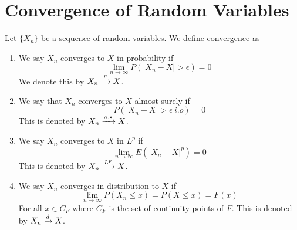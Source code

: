 \documentclass[openany]{report}
\begin{document}
    \chapter{Convergence of Random Variables}
    \begin{definition}
        Let $\{X_n\}$ be a sequence of random variables. We define convergence as 
        \begin{enumerate}[label=(\roman*)]
            \item We say $X_n$ converges to $X$ in probability if 
            \[\lim_{n\rightarrow\infty}P(|X_n-X| > \epsilon) = 0\]
            We denote this by $X_n \xrightarrow{P} X$. 
            \item We say that $X_n$ converges to $X$ almost surely if 
            \[P(|X_n - X| > \epsilon \ i.o) = 0\]
            This is denoted by $X_n \xrightarrow{a.s} X$.
            \item We say $X_n$ converges to $X$ in $L^p$ if 
            \[\lim_{n\rightarrow\infty}E(|X_n-X|^p) = 0\]
            This is denoted by $X_n \xrightarrow{L^p} X$.
            \item We say $X_n$ converges in distribution to $X$ if 
            \[\lim_{n\rightarrow \infty}P(X_n \leq x) = P(X \leq x) = F(x)\]
            For all $x \in C_F$ where $C_F$ is the set of continuity points of $F$. This is denoted by $X_n \xrightarrow{d} X$. 
        \end{enumerate}
    \end{definition}
\end{document}
